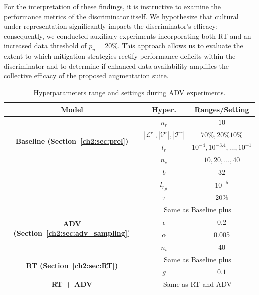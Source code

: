 For the interpretation of these findings, it is instructive to examine the performance metrics of the discriminator itself. 
We hypothesize that cultural under-representation significantly impacts the discriminator's efficacy; consequently, we conducted auxiliary experiments incorporating both RT and an increased data threshold of $p_u=20\%$. 
This approach allows us to evaluate the extent to which mitigation strategies rectify performance deficits within the discriminator and to determine if enhanced data availability amplifies the collective efficacy of the proposed augmentation suite.
%
\begin{table}
\footnotesize
\centering
\setlength{\tabcolsep}{0.1cm}
\renewcommand{\arraystretch}{1.5}
\centering
\begin{tabular}{c|c|c}
\toprule
\textbf{Model} & \textbf{Hyper.} & \textbf{Ranges/Setting} \\
\midrule
\multirow{4}{*}{\textbf{Baseline (Section~\ref{ch2:sec:prel})}} & $n_r$ & $10$ \\
\hhline{~--}
& $|\mathcal{L}^r|, |\mathcal{V}^r|, |\mathcal{T}^r|$& $70\%, 20\% 10\%$ \\
\hhline{~--}
& $l_r$ & $10^{-4}, 10^{-3.4}, \dots, 10^{-1}$\\
\hhline{~--}
& $n_e$ & $10, 20, \dots, 40$\\
\hhline{~--}
& $b$ & $32$\\
\hhline{~--}
& $l_{r_{ft}}$ & $10^{-5}$\\
\hhline{~--}
& $\tau$ & $20\%$\\
\midrule
\multirow{4}{*}{\textbf{ADV (Section~\ref{ch2:sec:adv_sampling})}} & \multicolumn{2}{c}{Same as Baseline plus}\\
\hhline{~--}
 & $\epsilon$ & 0.2\\
\hhline{~--}
 & $\alpha$ & 0.005\\
\hhline{~--}
 & $n_i$ & 40\\
\midrule
\multirow{2}{*}{\textbf{RT (Section~\ref{ch2:sec:RT})}} & \multicolumn{2}{c}{Same as Baseline plus}\\
\hhline{~--}
 & $g$ &  $0.1$\\
\midrule
\textbf{\textbf{RT + ADV}} & \multicolumn{2}{c}{Same as RT and ADV}\\
\bottomrule
\end{tabular}
\caption{Hyperparameters range and settings during ADV experiments.}
\label{ch3:tab:hyper:adv}
\end{table}
%

